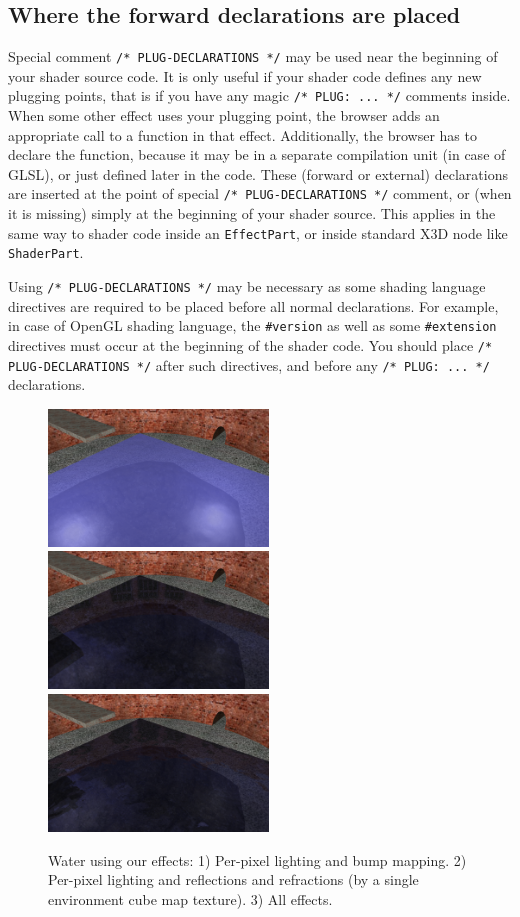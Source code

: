 \documentclass{acmsiggraph}                     %
\begin{document}
\subsection{Where the forward declarations are placed}

Special comment \texttt{/* PLUG-DECLARATIONS */} may be used
near the beginning of your shader source code. It is only useful
if your shader code defines any new plugging points, that is if you
have any magic \texttt{/* PLUG: ... */} comments inside.
When some other effect uses your plugging point, the browser adds
an appropriate call to a function in that effect.
Additionally, the browser has to declare the function,
because it may be in a separate compilation unit (in case of GLSL),
or just defined later in the code.
These (forward or external) declarations are inserted at
the point of special \texttt{/* PLUG-DECLARATIONS */}
comment, or (when it is missing) simply at the beginning of your shader source.
This applies in the same way to shader code inside an \texttt{EffectPart},
or inside standard X3D node like \texttt{ShaderPart}.

Using \texttt{/* PLUG-DECLARATIONS */} may be necessary
as some shading language directives are required to be placed before
all normal declarations. For example, in case of OpenGL shading language,
the \texttt{\#version} as well as some \texttt{\#extension} directives
must occur at the beginning of the shader code. You should place
\texttt{/* PLUG-DECLARATIONS */} after such directives,
and before any \texttt{/* PLUG: ... */} declarations.

\begin{figure}[t]
  \centering
  \includegraphics[width=2.3in]{water_shaders_1}
  \includegraphics[width=2.3in]{water_shaders_2}
  \includegraphics[width=2.3in]{water_shaders_3}
  \caption{Water using our effects: 1) Per-pixel lighting and bump mapping.
2) Per-pixel lighting and reflections and refractions (by a single environment cube map texture).
3) All effects.}
\end{figure}
\end{document}
